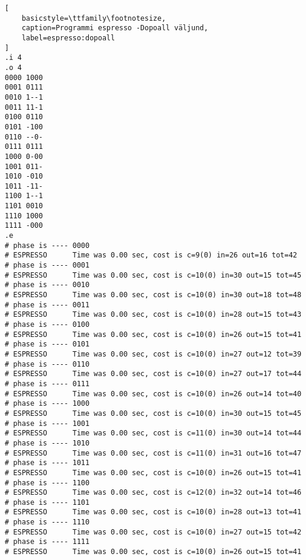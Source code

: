 \begin{lstlisting}[
    basicstyle=\ttfamily\footnotesize,
    caption=Programmi espresso -Dopoall väljund,
    label=espresso:dopoall
]
.i 4
.o 4
0000 1000
0001 0111
0010 1--1
0011 11-1
0100 0110
0101 -100
0110 --0-
0111 0111
1000 0-00
1001 011-
1010 -010
1011 -11-
1100 1--1
1101 0010
1110 1000
1111 -000
.e
# phase is ---- 0000
# ESPRESSO  	Time was 0.00 sec, cost is c=9(0) in=26 out=16 tot=42
# phase is ---- 0001
# ESPRESSO  	Time was 0.00 sec, cost is c=10(0) in=30 out=15 tot=45
# phase is ---- 0010
# ESPRESSO  	Time was 0.00 sec, cost is c=10(0) in=30 out=18 tot=48
# phase is ---- 0011
# ESPRESSO  	Time was 0.00 sec, cost is c=10(0) in=28 out=15 tot=43
# phase is ---- 0100
# ESPRESSO  	Time was 0.00 sec, cost is c=10(0) in=26 out=15 tot=41
# phase is ---- 0101
# ESPRESSO  	Time was 0.00 sec, cost is c=10(0) in=27 out=12 tot=39
# phase is ---- 0110
# ESPRESSO  	Time was 0.00 sec, cost is c=10(0) in=27 out=17 tot=44
# phase is ---- 0111
# ESPRESSO  	Time was 0.00 sec, cost is c=10(0) in=26 out=14 tot=40
# phase is ---- 1000
# ESPRESSO  	Time was 0.00 sec, cost is c=10(0) in=30 out=15 tot=45
# phase is ---- 1001
# ESPRESSO  	Time was 0.00 sec, cost is c=11(0) in=30 out=14 tot=44
# phase is ---- 1010
# ESPRESSO  	Time was 0.00 sec, cost is c=11(0) in=31 out=16 tot=47
# phase is ---- 1011
# ESPRESSO  	Time was 0.00 sec, cost is c=10(0) in=26 out=15 tot=41
# phase is ---- 1100
# ESPRESSO  	Time was 0.00 sec, cost is c=12(0) in=32 out=14 tot=46
# phase is ---- 1101
# ESPRESSO  	Time was 0.00 sec, cost is c=10(0) in=28 out=13 tot=41
# phase is ---- 1110
# ESPRESSO  	Time was 0.00 sec, cost is c=10(0) in=27 out=15 tot=42
# phase is ---- 1111
# ESPRESSO  	Time was 0.00 sec, cost is c=10(0) in=26 out=15 tot=41
\end{lstlisting}